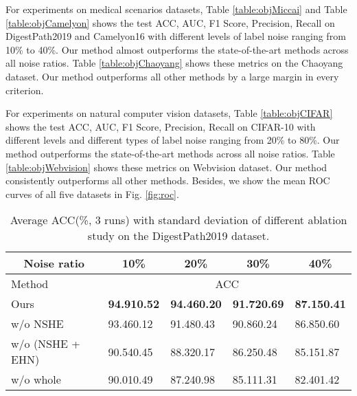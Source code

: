 {For experiments on medical scenarios datasets, Table \ref{table:objMiccai} and Table \ref{table:objCamelyon} shows the test ACC, AUC, F1 Score, {Precision}, Recall on DigestPath2019 and Camelyon16 with different levels of label noise ranging from 10\% to 40\%. Our method almost outperforms the state-of-the-art methods across all noise ratios. Table \ref{table:objChaoyang} shows these metrics on the Chaoyang dataset. Our method outperforms all other methods by a large margin in every criterion. 

For experiments on natural computer vision datasets, Table \ref{table:objCIFAR} shows the test ACC, AUC, F1 Score, {Precision}, Recall on CIFAR-10 with different levels and different types of label noise ranging from 20\% to 80\%. Our method outperforms the state-of-the-art methods across all noise ratios. Table \ref{table:objWebvision} shows these metrics on Webvision dataset. Our method consistently outperforms all other methods. Besides, we show the mean {ROC} curves of all five datasets in Fig. \ref{fig:roc}.}





\begin{table}[]
\scriptsize
\centering
\caption{Average ACC(\%, 3 runs) with standard deviation of different ablation study on the DigestPath2019 dataset.}
\label{table:albMiccai}
\begin{tabular}{lllll}
\toprule
\multicolumn{1}{c}{Noise ratio}        & \multicolumn{1}{c}{10\%} & \multicolumn{1}{c}{20\%} & \multicolumn{1}{c}{30\%} & \multicolumn{1}{c}{40\%} \\ \midrule
Method                 & \multicolumn{4}{c}{ACC}                                                                                     \\ \midrule
Ours                                       & \textbf{94.910.52}      & \textbf{94.460.20}      & \textbf{91.720.69}      & \textbf{87.150.41}     \\ 
w/o NSHE                       & 93.460.12               & 91.480.43               & 90.860.24               & 86.850.60              \\ 
w/o (NSHE + EHN)       & 90.540.45               & 88.320.17               & 86.250.48               & 85.151.87              \\ 
w/o whole & 90.010.49               & 87.240.98               & 85.111.31               & 82.401.42              \\ \bottomrule
\end{tabular}
\end{table}

